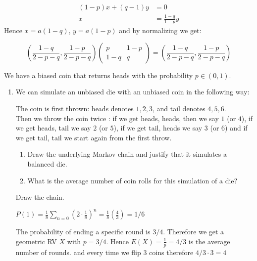 \documentclass[a4paper,11pt]{exam}
\begin{document}
\begin{questions}
\begin{enumerate}
	\begin{solution}
		\begin{align*}
		\left(1-p\right)x+\left(q-1\right)y & =0\\
		x&=  \frac{1-q}{1-p}y
		\end{align*}
		Hence $ x=a(1-q) $, $ y=a(1-p) $ and by normalizing we get:
		
		\[
		\left(\frac{1-q}{2-p-q},\frac{1-p}{2-p-q}\right)
		\left(\begin{array}{cc}
		p & 1-p\\
		1-q & q
		\end{array}\right)=\left(\frac{1-q}{2-p-q},\frac{1-p}{2-p-q}\right)
		\]
		
	\end{solution}
\end{enumerate}





\question

We have a biased coin that returns heads with the probability  $ p\in(0,1)$.
\begin{enumerate}
	\item We can simulate an unbiased die with an unbiased coin in the following way:
	
	The coin is first thrown: heads denotes $ 1,2,3 $, and tail denotes $ 4,5,6 $. 
	\\
	Then we throw the coin twice : if we get heads, heads, then we say $ 1 $ (or $ 4 $), if we get heads, tail we say $ 2 $ (or $ 5 $), if we get tail, heads we say $ 3 $ (or $ 6 $) and if we get tail, tail we start again from the first throw.
	
	\begin{enumerate}
		\item Draw the underlying Markov chain and justify that it simulates a balanced die.
		\item What is the average number of coin rolls for this simulation of a die?
	\end{enumerate}

	\begin{solution}
		Draw the chain.
		
		$P(1)=\frac{1}{8}\sum_{n=0}\left(2\cdot\frac{1}{8}\right)^n = \frac{1}{8}\left(\frac{4}{3}\right) = 1/6$
		
		The probability of ending a specific round is $3/4$. Therefore we get a geometric RV $X$ with $p=3/4$. Hence $E(X) = \frac{1}{p}=4/3$ is the average number of rounds. and every time we flip 3 coins therefore $ 4 / 3 \cdot 3 = 4 $
		

\end{solution}
\end{enumerate}
\end{questions}
\end{document}
